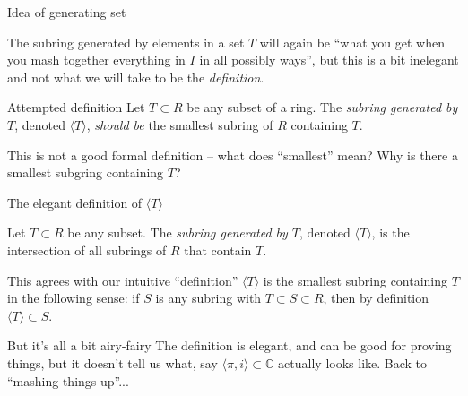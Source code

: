 \documentclass{beamer}
\begin{document}
\begin{frame}{Idea of generating set}

The subring generated by elements in a set $T$ will again be ``what you get when you mash together everything in $I$ in all possibly ways'', but this is a bit inelegant and not what we will take to be the \emph{definition}.


\begin{block}{Attempted definition} Let $T\subset R$ be any subset of a ring.  The \emph{subring generated by $T$}, denoted $\langle T\rangle$, \emph{should be} the smallest subring of $R$ containing $T$.
\end{block}

This is not a good formal definition -- what does ``smallest'' mean?  Why is there a smallest subgring containing $T$? 


\end{frame}


\begin{frame}{The elegant definition of $\langle T\rangle$}

\begin{definition} Let $T\subset R$ be any subset.  The \emph{subring generated by $T$}, denoted $\langle T\rangle$, is the intersection of all subrings of $R$ that contain $T$.
\end{definition}

\begin{block}{This agrees with our intuitive ``definition''}
$\langle T\rangle $ is the smallest subring containing $T$ in the following sense: if $S$ is any subring with $T\subset S\subset R$, then by definition $\langle T\rangle \subset S$.
\end{block}

\begin{block}{But it's all a bit airy-fairy}
The definition is elegant, and can be good for proving things, but it doesn't tell us what, say $\langle \pi, i \rangle \subset \mathbb{C}$ actually looks like.  Back to ``mashing things up''...
\end{block}


\end{frame}
\end{document}
